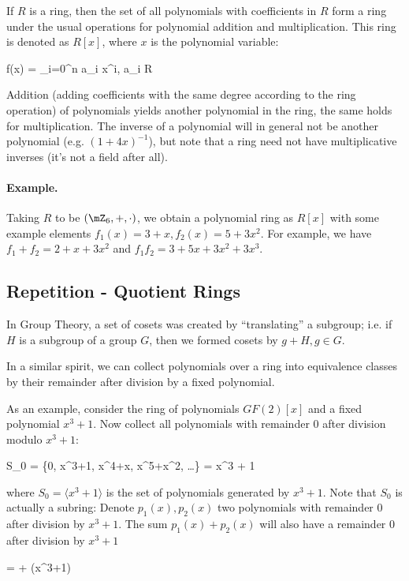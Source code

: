 If $R$ is a ring, then the set of all polynomials with coefficients in $R$ form a ring under the usual operations for polynomial addition and multiplication. This ring is denoted as $R[x]$, where $x$ is the polynomial variable:

\bee
f(x) = \sum_{i=0}^n a_i x^i, a_i \in R
\eee

Addition (adding coefficients with the same degree according to the ring operation) of polynomials yields another polynomial in the ring, the same holds for multiplication. The inverse of a polynomial will in general not be another polynomial (e.g. $(1 + 4x)^{-1}$), but note that a ring need not have multiplicative inverses (it's not a field after all).

\paragraph{Example.} Taking $R$ to be $(\mZ_6, +, \cdot)$, we obtain a polynomial ring as $R[x]$ with some example elements $f_1(x) = 3 + x, f_2(x) = 5 + 3x^2$. For example, we have $f_1 + f_2 = 2 + x + 3x^2$ and $f_1 f_2 = 3 + 5x + 3x^2 + 3x^3$.

\subsection{Repetition - Quotient Rings}

In Group Theory, a set of cosets was created by ``translating'' a subgroup; i.e. if $H$ is a subgroup of a group $G$, then we formed cosets by $g + H, g \in G$.

In a similar spirit, we can collect polynomials over a ring into equivalence classes by their remainder after division by a fixed polynomial.

As an example, consider the ring of polynomials $GF(2)[x]$ and a fixed polynomial $x^3+1$. Now collect all polynomials with remainder $0$ after division modulo $x^3+1$:

\bee
S_0 = \{0, x^3+1, x^4+x, x^5+x^2, \ldots\} = \langle x^3 + 1 \rangle
\eee

where $S_0 = \langle x^3 + 1 \rangle$ is the set of polynomials generated by $x^3+1$. Note that $S_0$ is actually a subring: Denote $p_1(x), p_2(x)$ two polynomials with remainder $0$ after division by $x^3+1$. The sum $p_1(x) + p_2(x)$ will also have a remainder $0$ after division by $x^3+1$

\bee
{} =  +   \bmod (x^3+1)
\eee

